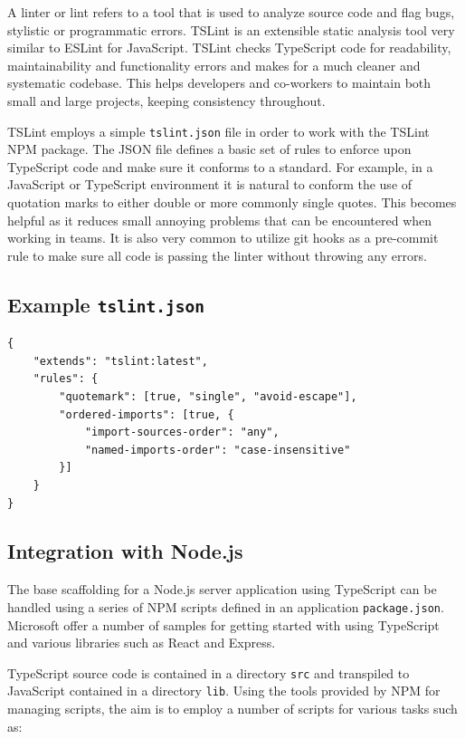 A linter or lint refers to a tool that is used to analyze source code and flag bugs, stylistic or programmatic errors. TSLint\cite{tslint} is an extensible static analysis tool very similar to ESLint for JavaScript. TSLint checks TypeScript code for readability, maintainability and functionality errors and makes for a much cleaner and systematic codebase. This helps developers and co-workers to maintain both small and large projects, keeping consistency throughout.

TSLint employs a simple \texttt{tslint.json} file in order to work with the TSLint NPM package. The JSON file defines a basic set of rules to enforce upon TypeScript code and make sure it conforms to a standard. For example, in a JavaScript or TypeScript environment it is natural to conform the use of quotation marks to either double or more commonly single quotes. This becomes helpful as it reduces small annoying problems that can be encountered when working in teams.
It is also very common to utilize git hooks\cite{githooks} as a pre-commit rule to make sure all code is passing the linter without throwing any errors.

\subsection*{Example \texttt{tslint.json}}
\begin{verbatim}
{
    "extends": "tslint:latest",
    "rules": {
        "quotemark": [true, "single", "avoid-escape"],
        "ordered-imports": [true, {
            "import-sources-order": "any",
            "named-imports-order": "case-insensitive"
        }]
    }
}
\end{verbatim}

\subsection{Integration with Node.js}
The base scaffolding for a Node.js server application using TypeScript can be handled using a series of NPM scripts\cite{npmscripts} defined in an application \texttt{package.json}. Microsoft offer a number of samples for getting started with using TypeScript and various libraries such as React and Express\cite{typescript}.

TypeScript source code is contained in a directory \texttt{src} and transpiled to JavaScript contained in a directory \texttt{lib}.
Using the tools provided by NPM for managing scripts, the aim is to employ a number of scripts for various tasks such as:

